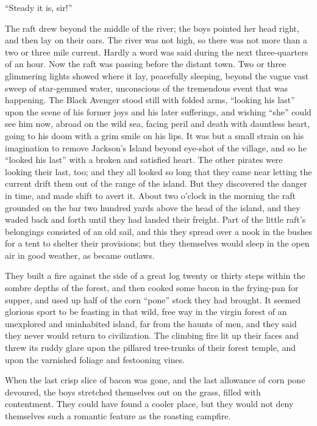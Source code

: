 \documentclass{book}
\begin{document}
“Steady it is, sir!”

The raft drew beyond the middle of the river; the boys pointed her head right, and then lay on their oars. The river was not high, so there was not more than a two or three mile current. Hardly a word was said during the next three-quarters of an hour. Now the raft was passing before the distant town. Two or three glimmering lights showed where it lay, peacefully sleeping, beyond the vague vast sweep of star-gemmed water, unconscious of the tremendous event that was happening. The Black Avenger stood still with folded arms, “looking his last” upon the scene of his former joys and his later sufferings, and wishing “she” could see him now, abroad on the wild sea, facing peril and death with dauntless heart, going to his doom with a grim smile on his lips. It was but a small strain on his imagination to remove Jackson’s Island beyond eye-shot of the village, and so he “looked his last” with a broken and satisfied heart. The other pirates were looking their last, too; and they all looked so long that they came near letting the current drift them out of the range of the island. But they discovered the danger in time, and made shift to avert it. About two o’clock in the morning the raft grounded on the bar two hundred yards above the head of the island, and they waded back and forth until they had landed their freight. Part of the little raft’s belongings consisted of an old sail, and this they spread over a nook in the bushes for a tent to shelter their provisions; but they themselves would sleep in the open air in good weather, as became outlaws.

They built a fire against the side of a great log twenty or thirty steps within the sombre depths of the forest, and then cooked some bacon in the frying-pan for supper, and used up half of the corn “pone” stock they had brought. It seemed glorious sport to be feasting in that wild, free way in the virgin forest of an unexplored and uninhabited island, far from the haunts of men, and they said they never would return to civilization. The climbing fire lit up their faces and threw its ruddy glare upon the pillared tree-trunks of their forest temple, and upon the varnished foliage and festooning vines.

When the last crisp slice of bacon was gone, and the last allowance of corn pone devoured, the boys stretched themselves out on the grass, filled with contentment. They could have found a cooler place, but they would not deny themselves such a romantic feature as the roasting campfire.
\end{document}
